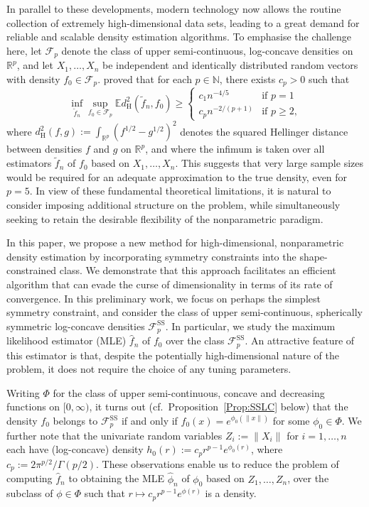 \documentclass[a4paper,12pt]{article}
\begin{document}
In parallel to these developments, modern technology now allows the routine collection of extremely high-dimensional data sets, leading to a great demand for reliable and scalable density estimation algorithms.  To emphasise the challenge here, let $\mathcal{F}_p$ denote the class of upper semi-continuous, log-concave densities on $\mathbb{R}^p$, and let $X_1,\ldots,X_n$ be independent and identically distributed random vectors with density $f_0 \in \mathcal{F}_p$.  \citet{kim2016global} proved that for each $p \in \mathbb{N}$, there exists $c_p > 0$ such that 
\[
\inf_{\tilde{f}_n} \sup_{f_0 \in \mathcal{F}_p} \mathbb{E}d_{\mathrm{H}}^2(\tilde{f}_n,f_0) \geq \left\{ \begin{array}{ll} c_1 n^{-4/5} & \mbox{if $p=1$} \\
c_p n^{-2/(p+1)} & \mbox{if $p \geq 2$}, \end{array} \right.
\]
where $d_{\mathrm{H}}^2(f,g) := \int_{\mathbb{R}^p} (f^{1/2}-g^{1/2})^2$ denotes the squared Hellinger distance between densities $f$ and $g$ on $\mathbb{R}^p$, and where the infimum is taken over all estimators $\tilde{f}_n$ of $f_0$ based on $X_1,\ldots,X_n$.  This suggests that very large sample sizes would be required for an adequate approximation to the true density, even for $p=5$.  In view of these fundamental theoretical limitations, it is natural to consider imposing additional structure on the problem, while simultaneously seeking to retain the desirable flexibility of the nonparametric paradigm.   

In this paper, we propose a new method for high-dimensional, nonparametric density estimation by incorporating symmetry constraints into the shape-constrained class.  We demonstrate that this approach facilitates an efficient algorithm that can evade the curse of dimensionality in terms of its rate of convergence.  In this preliminary work, we focus on perhaps the simplest symmetry constraint, and consider the class of upper semi-continuous, spherically symmetric log-concave densities $\mathcal{F}_p^{\mathrm{SS}}$.  In particular, we study the maximum likelihood estimator (MLE) $\hat{f}_n$ of $f_0$ over the class $\mathcal{F}_p^{\mathrm{SS}}$.  An attractive feature of this estimator is that, despite the potentially high-dimensional nature of the problem, it does not require the choice of any tuning parameters.

Writing $\Phi$ for the class of upper semi-continuous, concave and decreasing functions on $[0,\infty)$, it turns out (cf.~Proposition~\ref{Prop:SSLC} below) that the density $f_0$ belongs to $\mathcal{F}_p^{\mathrm{SS}}$ if and only if $f_0(x) = e^{\phi_0(\|x\|)}$ for some $\phi_0 \in \Phi$.  We further note that the univariate random variables $Z_i := \|X_i\|$ for $i=1,\ldots,n$ each have (log-concave) density $h_0(r) := c_pr^{p-1}e^{\phi_0(r)}$, where $c_p := 2\pi^{p/2}/\Gamma(p/2)$.  These observations enable us to reduce the problem of computing $\hat{f}_n$ to obtaining the MLE $\hat{\phi}_n$ of $\phi_0$ based on $Z_1,\ldots,Z_n$, over the subclass of $\phi \in \Phi$ such that $r \mapsto c_pr^{p-1}e^{\phi(r)}$ is a density.
\end{document}
